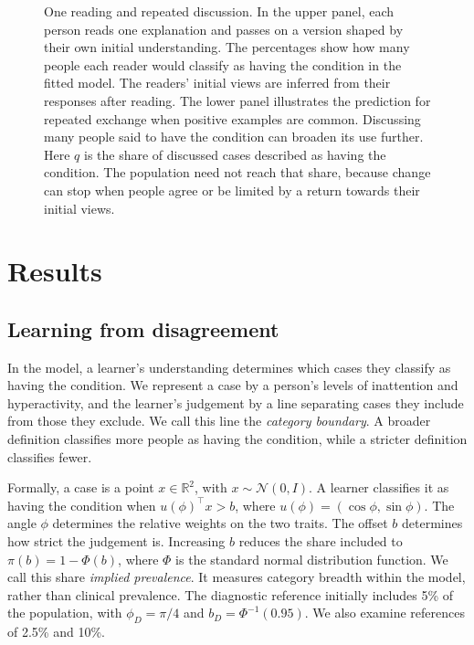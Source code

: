 \documentclass[11pt]{article}
\begin{document}
\begin{figure}[tbp]
\centering
\resizebox{\textwidth}{!}{\figconcept}
\caption{One reading and repeated discussion. In the upper panel, each person reads one explanation and passes on a version shaped by their own initial understanding. The percentages show how many people each reader would classify as having the condition in the fitted model. The readers' initial views are inferred from their responses after reading. The lower panel illustrates the prediction for repeated exchange when positive examples are common. Discussing many people said to have the condition can broaden its use further. Here $q$ is the share of discussed cases described as having the condition. The population need not reach that share, because change can stop when people agree or be limited by a return towards their initial views.}
\label{fig:concept}
\end{figure}

\section{Results}

\subsection{Learning from disagreement}

In the model, a learner's understanding determines which cases they classify as having the condition. We represent a case by a person's levels of inattention and hyperactivity, and the learner's judgement by a line separating cases they include from those they exclude. We call this line the \emph{category boundary}. A broader definition classifies more people as having the condition, while a stricter definition classifies fewer.

Formally, a case is a point $x\in\mathbb{R}^2$, with $x\sim\mathcal{N}(0,I)$. A learner classifies it as having the condition when $u(\phi)^\top x>b$, where $u(\phi)=(\cos\phi,\sin\phi)$. The angle $\phi$ determines the relative weights on the two traits. The offset $b$ determines how strict the judgement is. Increasing $b$ reduces the share included to $\pi(b)=1-\Phi(b)$, where $\Phi$ is the standard normal distribution function. We call this share \emph{implied prevalence}. It measures category breadth within the model, rather than clinical prevalence. The diagnostic reference initially includes 5\% of the population, with $\phi_D=\pi/4$ and $b_D=\Phi^{-1}(0.95)$. We also examine references of 2.5\% and 10\%.
\end{document}
